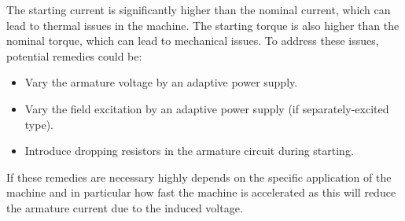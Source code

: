\begin{solutionblock}
    The starting current is significantly higher than the nominal current, which can lead to thermal issues in the machine. The starting torque is also higher than the nominal torque, which can lead to mechanical issues. To address these issues, potential remedies could be:
    \begin{itemize}
        \item Vary the armature voltage by an adaptive power supply. 
        \item Vary the field excitation by an adaptive power supply (if separately-excited type).
        \item Introduce dropping resistors in the armature circuit during starting.
    \end{itemize}
    If these remedies are necessary highly depends on the specific application of the machine and in particular how fast the machine is accelerated as this will reduce the armature current due to the induced voltage. 
\end{solutionblock}